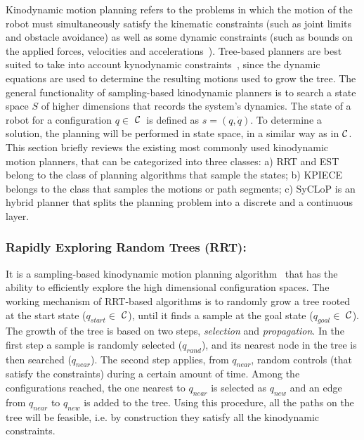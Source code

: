 \documentclass[runningheads,a4paper]{llncs}
\newcommand {\Cs}{\hbox{{$\cal C$}}}                %
\begin{document}
Kinodynamic motion planning refers to the problems in which the motion of the robot must simultaneously satisfy the kinematic constraints (such as joint limits
and obstacle avoidance) as well as some dynamic constraints (such as bounds on the applied forces, velocities and accelerations~\cite{donald1993}).
Tree-based planners are best suited to take into account kynodynamic constraints~\cite{tsianos2007}, since the  dynamic equations are
used to determine the resulting motions used to grow the tree.
The general functionality of sampling-based
kinodynamic planners is to search a state space $S$ of higher dimensions that records the system's dynamics. The state of a robot for a configuration
$q \in$ \Cs\ is defined as $s=(q,\dot{q})$. To determine a solution, the planning will be performed in state space, in a similar way
as in \Cs. This section briefly reviews the existing most commonly used kinodynamic motion planners, that can be categorized into three classes:
a) RRT and EST belong to the class
of planning algorithms that
sample the states; b) KPIECE belongs to the class that samples the motions or path segments; c) SyCLoP is an hybrid planner
that splits the planning problem into a discrete and a continuous layer.
\vspace{-4mm}
\subsubsection{Rapidly Exploring Random Trees (RRT):}
It is a sampling-based kinodynamic motion planning algorithm~\cite{lavalle2001} that has the ability to efficiently explore the high dimensional configuration
spaces. The working mechanism of RRT-based algorithms is to randomly grow a tree rooted at the start state ($q_{start}\in $ \Cs), until it finds
 a sample at the goal state ($q_{goal} \in $ \Cs). The growth of the tree is based on two steps, \textit{selection} and \textit{propagation}. In the
first step a sample is randomly selected ($q_{rand}$), and its nearest node in the tree is then searched ($q_{near}$). The second step applies, from $q_{near}$,
random controls (that satisfy the constraints) during a certain amount of time. Among the configurations reached, the one nearest to $q_{near}$ is selected as $q_{new}$ and an edge from
$q_{near}$ to $q_{new}$ is added to the tree. Using this procedure, all the paths on the tree will be feasible, i.e. by construction they satisfy all the kinodynamic
constraints.
\vspace{-4mm}
\end{document}
